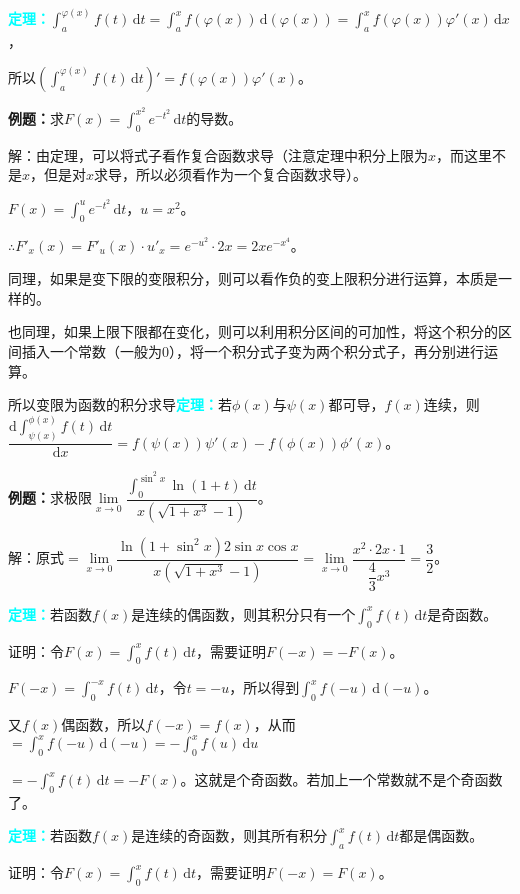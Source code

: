 \documentclass[UTF8, 12pt]{ctexart}
\begin{document}
\textcolor{aqua}{\textbf{定理：}}$\int_a^{\varphi(x)}f(t)\,\textrm{d}t=\int_a^xf(\varphi(x))\,\textrm{d}(\varphi(x))=\int_a^xf(\varphi(x))\varphi'(x)\,\textrm{d}x$，

所以$(\int_a^{\varphi(x)}f(t)\,\textrm{d}t)'=f(\varphi(x))\varphi'(x)$。

\textbf{例题：}求$F(x)=\int_0^{x^2}e^{-t^2}\,\textrm{d}t$的导数。

解：由定理，可以将式子看作复合函数求导（注意定理中积分上限为$x$，而这里不是$x$，但是对$x$求导，所以必须看作为一个复合函数求导）。

$F(x)=\int_0^ue^{-t^2}\,\textrm{d}t$，$u=x^2$。

$\therefore F'_x(x)=F'_u(x)\cdot u'_x=e^{-u^2}\cdot 2x=2xe^{-x^4}$。

同理，如果是变下限的变限积分，则可以看作负的变上限积分进行运算，本质是一样的。

也同理，如果上限下限都在变化，则可以利用积分区间的可加性，将这个积分的区间插入一个常数（一般为0），将一个积分式子变为两个积分式子，再分别进行运算。

所以变限为函数的积分求导\textcolor{aqua}{\textbf{定理：}}若$\phi(x)$与$\psi(x)$都可导，$f(x)$连续，则$\dfrac{\textrm{d}\int_{\psi(x)}^{\phi(x)}f(t)\,\textrm{d}t}{\textrm{d}x}=f(\psi(x))\psi'(x)-f(\phi(x))\phi'(x)$。

\textbf{例题：}求极限$\lim\limits_{x\to 0}\dfrac{\int_0^{\sin^2x}\ln(1+t)\,\textrm{d}t}{x(\sqrt{1+x^3}-1)}$。

解：原式$=\lim\limits_{x\to 0}\dfrac{\ln(1+\sin^2x)2\sin x\cos x}{x(\sqrt{1+x^3}-1)}=\lim\limits_{x\to 0}\dfrac{x^2\cdot 2x\cdot 1}{\dfrac{4}{3}x^3}=\dfrac{3}{2}$。\smallskip

\textcolor{aqua}{\textbf{定理：}}若函数$f(x)$是连续的偶函数，则其积分只有一个$\int^x_0f(t)\,\textrm{d}t$是奇函数。

证明：令$F(x)=\int_0^xf(t)\,\textrm{d}t$，需要证明$F(-x)=-F(x)$。

$F(-x)=\int_0^{-x}f(t)\,\textrm{d}t$，令$t=-u$，所以得到$\int_0^xf(-u)\,\textrm{d}(-u)$。

又$f(x)$偶函数，所以$f(-x)=f(x)$，从而$=\int_0^xf(-u)\,\textrm{d}(-u)=-\int_0^xf(u)\,\textrm{d}u$

$=-\int_0^xf(t)\,\textrm{d}t=-F(x)$。这就是个奇函数。若加上一个常数就不是个奇函数了。

\textcolor{aqua}{\textbf{定理：}}若函数$f(x)$是连续的奇函数，则其所有积分$\int^x_af(t)\,\textrm{d}t$都是偶函数。

证明：令$F(x)=\int_0^xf(t)\,\textrm{d}t$，需要证明$F(-x)=F(x)$。
\end{document}
